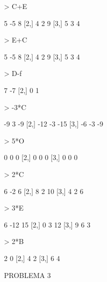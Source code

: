 \documentclass{article}
\begin{document}
\begin{Schunk}
\begin{Sinput}
> C+E
\end{Sinput}
\begin{Soutput}
     [,1] [,2] [,3]
[1,]    5   -5    8
[2,]    4    2    9
[3,]    5    3    4
\end{Soutput}
\begin{Sinput}
> E+C
\end{Sinput}
\begin{Soutput}
     [,1] [,2] [,3]
[1,]    5   -5    8
[2,]    4    2    9
[3,]    5    3    4
\end{Soutput}
\begin{Sinput}
> D-f
\end{Sinput}
\begin{Soutput}
     [,1] [,2]
[1,]    7   -7
[2,]    0    1
\end{Soutput}
\begin{Sinput}
> -3*C
\end{Sinput}
\begin{Soutput}
     [,1] [,2] [,3]
[1,]   -9    3   -9
[2,]  -12   -3  -15
[3,]   -6   -3   -9
\end{Soutput}
\begin{Sinput}
> 5*O
\end{Sinput}
\begin{Soutput}
     [,1] [,2] [,3]
[1,]    0    0    0
[2,]    0    0    0
[3,]    0    0    0
\end{Soutput}
\begin{Sinput}
> 2*C
\end{Sinput}
\begin{Soutput}
     [,1] [,2] [,3]
[1,]    6   -2    6
[2,]    8    2   10
[3,]    4    2    6
\end{Soutput}
\begin{Sinput}
> 3*E
\end{Sinput}
\begin{Soutput}
     [,1] [,2] [,3]
[1,]    6  -12   15
[2,]    0    3   12
[3,]    9    6    3
\end{Soutput}
\begin{Sinput}
> 2*B
\end{Sinput}
\begin{Soutput}
     [,1] [,2]
[1,]    2    0
[2,]    4    2
[3,]    6    4
\end{Soutput}
\end{Schunk}
PROBLEMA 3
\end{document}
